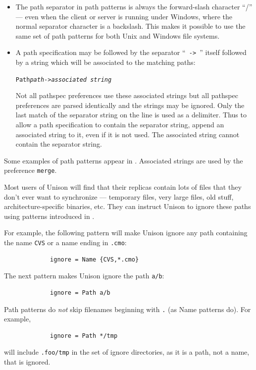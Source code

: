 \documentclass{article}
\newcommand{\ARG}[1]{\texttt{\textit{#1}}}
\begin{document}
\begin{itemize}
\begin{itemize}
  these will be interpreted literally as part of the strings to be matched!)
\end{itemize}
\item
The path separator in path patterns is always the
forward-slash character ``/'' --- even when the client or server is
running under Windows, where the normal separator character is a
backslash.  This makes it possible to use the same set of path
patterns for both Unix and Windows file systems.
\item
A path specification may be followed by the separator ``\verb| -> |'' itself
followed by a string which will be associated to the matching paths:
\begin{alltt}
                 Path \ARG{path} -> \ARG{associated string}
\end{alltt}
Not all pathspec preferences use these associated strings but all pathspec
preferences are parsed identically and the strings may be ignored.  Only the
last match of the separator string on the line is used as a delimiter.  Thus
to allow a path specification to contain the separator string, append an
associated string to it, even if it is not used.  The associated string cannot
contain the separator string.
\end{itemize}
Some examples of path patterns appear in .
Associated strings are used by the preference \texttt{merge}.


Most users of Unison will find that their replicas contain lots of
files that they don't ever want to synchronize --- temporary files,
very large files, old stuff, architecture-specific binaries, etc.
They can instruct Unison to ignore these paths using patterns
introduced in .

For example, the following pattern will make Unison ignore any
path containing the name \verb|CVS| or a name ending in \verb|.cmo|:
\begin{verbatim}
             ignore = Name {CVS,*.cmo}
\end{verbatim}
The next pattern makes Unison ignore the path \verb|a/b|:
\begin{verbatim}
             ignore = Path a/b
\end{verbatim}
Path patterns do {\em not} skip filenames beginning with \verb|.| (as Name
patterns do).  For example,
\begin{verbatim}
             ignore = Path */tmp
\end{verbatim}
will include \verb|.foo/tmp| in the set of ignore directories, as it is a
path, not a name, that is ignored.
\end{document}
